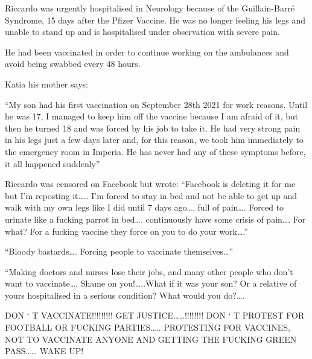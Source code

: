 Riccardo was urgently hospitalised in Neurology because of the Guillain-Barré
Syndrome, 15 days after the Pfizer Vaccine. He was no longer feeling his legs
and unable to stand up and is hospitalised under observation with severe pain.

He had been vaccinated in order to continue working on the ambulances and avoid being swabbed every 48 hours.

Katia his mother says:

“My son had his first vaccination on September 28th 2021 for work reasons. Until
he was 17, I managed to keep him off the vaccine because I am afraid of it, but
then he turned 18 and was forced by his job to take it. He had very strong pain
in his legs just a few days later and, for this reason, we took him immediately
to the emergency room in Imperia. He has never had any of these symptoms before,
it all happened suddenly”

Riccardo was censored on Facebook but wrote: “Facebook is deleting it for me but
I’m reposting it…..  I’m forced to stay in bed and not be able to get up and
walk with my own legs like I did until 7 days ago…. full of pain…. Forced to
urinate like a fucking parrot in bed…. continuously have some crisis of pain….
For what? For a fucking vaccine they force on you to do your work….”

“Bloody bastards…. Forcing people to vaccinate themselves…”

“Making doctors and nurses lose their jobs, and many other people who don’t want
to vaccinate…. Shame on you!…..What if it was your son? Or a relative of yours
hospitalised in a serious condition?  What would you do?….

DON ‘ T VACCINATE!!!!!!!!!  GET JUSTICE……!!!!!!!!  DON ‘ T PROTEST FOR FOOTBALL
OR FUCKING PARTIES…..  PROTESTING FOR VACCINES, NOT TO VACCINATE ANYONE AND
GETTING THE FUCKING GREEN PASS……  WAKE UP!

